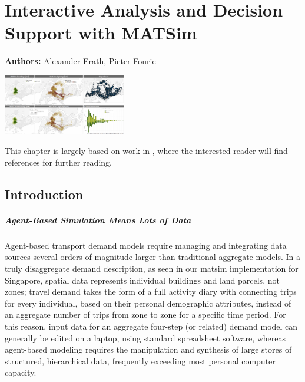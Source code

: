 \chapter{Interactive Analysis and Decision Support with MATSim}
\label{ch:businessanalytics}

\hfill \textbf{Authors:} Alexander Erath, Pieter Fourie

\begin{center} \includegraphics[width=0.4\textwidth, angle=0]{extending/figures/businessanalytics/tableau.png} \end{center}



This chapter is largely based on work in \citet[][]{ErathEtAl_EASTS_2013}, where the interested reader will find references for further reading.
\section{Introduction}
\label{sec:analyticsIntro}
\paragraph{Agent-Based Simulation Means Lots of Data}
Agent-based transport demand models require managing and integrating data sources several orders of magnitude larger than traditional aggregate models. In a truly disaggregate demand description, as seen in our \gls{matsim} implementation for Singapore, spatial data represents individual buildings and land parcels, not zones; travel demand takes the form of a full activity diary with connecting trips for every individual, based on their personal demographic attributes, instead of an aggregate number of trips from zone to zone for a specific time period. For this reason, input data for an aggregate four-step (or related) demand model can generally be edited on a laptop, using standard spreadsheet software, whereas agent-based modeling requires the manipulation and synthesis of large stores of structured, hierarchical data, frequently exceeding most personal computer capacity. %

